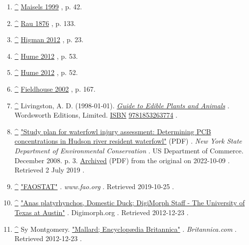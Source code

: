 \documentclass[11pt,a4paper]{article}
\begin{document}
\begin{enumerate}
\item \href{\#cite\_ref-FOOTNOTEMaisels199942\_37-0}{\textbf{\textasciicircum{}}} \href{\#CITEREFMaisels1999}{Maisels 1999} , p. 42.
\item \href{\#cite\_ref-FOOTNOTERau1876133\_38-0}{\textbf{\textasciicircum{}}} \href{\#CITEREFRau1876}{Rau 1876} , p. 133.
\item \href{\#cite\_ref-FOOTNOTEHigman201223\_39-0}{\textbf{\textasciicircum{}}} \href{\#CITEREFHigman2012}{Higman 2012} , p. 23.
\item \href{\#cite\_ref-FOOTNOTEHume201253\_40-0}{\textbf{\textasciicircum{}}} \href{\#CITEREFHume2012}{Hume 2012} , p. 53.
\item \href{\#cite\_ref-FOOTNOTEHume201252\_41-0}{\textbf{\textasciicircum{}}} \href{\#CITEREFHume2012}{Hume 2012} , p. 52.
\item \href{\#cite\_ref-FOOTNOTEFieldhouse2002167\_42-0}{\textbf{\textasciicircum{}}} \href{\#CITEREFFieldhouse2002}{Fieldhouse 2002} , p. 167.
\item \href{\#cite\_ref-43}{\textbf{\textasciicircum{}}} Livingston, A. D. (1998-01-01). \href{https://books.google.com/books?id=NViSMffyaSgC\&q=\%C2\%A0\%C2\%A0In+many+areas,+wild+ducks+of+various+species+are+hunted+for+food+or+sport}{\textit{Guide to Edible Plants and Animals}} . Wordsworth Editions, Limited. \href{/wiki/ISBN\_\%28identifier\%29}{ISBN} \href{/wiki/Special:BookSources/9781853263774}{9781853263774} .
\item \href{\#cite\_ref-44}{\textbf{\textasciicircum{}}} \href{https://www.dec.ny.gov/docs/fish\_marine\_pdf/wfp09a.pdf}{"Study plan for waterfowl injury assessment: Determining PCB concentrations in Hudson river resident waterfowl"} (PDF) . \textit{New York State Department of Environmental Conservation} . US Department of Commerce. December 2008. p. 3. \href{https://ghostarchive.org/archive/20221009/https://www.dec.ny.gov/docs/fish\_marine\_pdf/wfp09a.pdf}{Archived} (PDF) from the original on 2022-10-09 . Retrieved 2 July 2019 .
\item \href{\#cite\_ref-45}{\textbf{\textasciicircum{}}} \href{http://www.fao.org/faostat/en/\#data/QL}{"FAOSTAT"} . \textit{www.fao.org} . Retrieved 2019-10-25 .
\item \href{\#cite\_ref-46}{\textbf{\textasciicircum{}}} \href{http://digimorph.org/specimens/anas\_platyrhynchos/skull/}{"Anas platyrhynchos, Domestic Duck; DigiMorph Staff - The University of Texas at Austin"} . Digimorph.org . Retrieved 2012-12-23 .
\item \href{\#cite\_ref-47}{\textbf{\textasciicircum{}}} Sy Montgomery. \href{https://www.britannica.com/eb/topic-360302/mallard}{"Mallard; Encyclopædia Britannica"} . \textit{Britannica.com} . Retrieved 2012-12-23 .

\end{enumerate}
\end{document}
